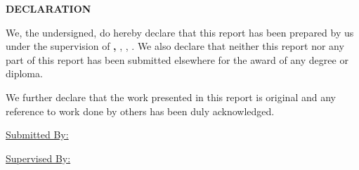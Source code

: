 
\clearpage
\thispagestyle{frontmatter}
{}

\begin{center}
    {\Large\bfseries DECLARATION}
\end{center}

\vspace{0.8cm}

\noindent We, the undersigned, do hereby declare that this report has been prepared by us under the supervision of \textbf{\supervisorname, \supervisordesignation}, \departmentname, \universityname. We also declare that neither this report nor any part of this report has been submitted elsewhere for the award of any degree or diploma.

\vspace{0.3cm}

\noindent We further declare that the work presented in this report is original and any reference to work done by others has been duly acknowledged.



\vspace{1cm}
\noindent\underline{Submitted By:}

\vspace{0.5cm}
\noindent
\begin{minipage}[t]{0.48\textwidth}
    \centering
\end{minipage}%
\hfill
\begin{minipage}[t]{0.48\textwidth}
    \centering
\end{minipage}

\vspace{0.5cm}
\noindent
\begin{minipage}[t]{0.48\textwidth}
    \centering
\end{minipage}%
\hfill
\begin{minipage}[t]{0.48\textwidth}
    \centering
\end{minipage}

\vspace{1cm}
\noindent\underline{Supervised By:}

\sigblockcompact{\supervisorname}{\supervisordesignation}{\departmentname}{\universityname}
